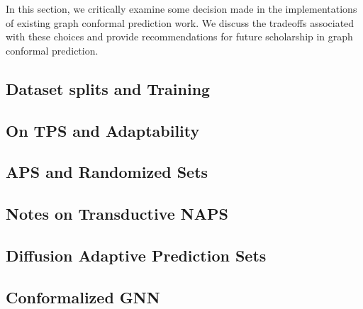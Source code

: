 In this section, we critically examine some decision made in the implementations of existing graph conformal prediction work.
We discuss the tradeoffs associated with these choices and provide recommendations for future scholarship in graph conformal prediction.

\subsection{Dataset splits and Training}



\subsection{On TPS and Adaptability}


\subsection{APS and Randomized Sets}


\subsection{Notes on Transductive NAPS}


\subsection{Diffusion Adaptive Prediction Sets}


\subsection{Conformalized GNN}

